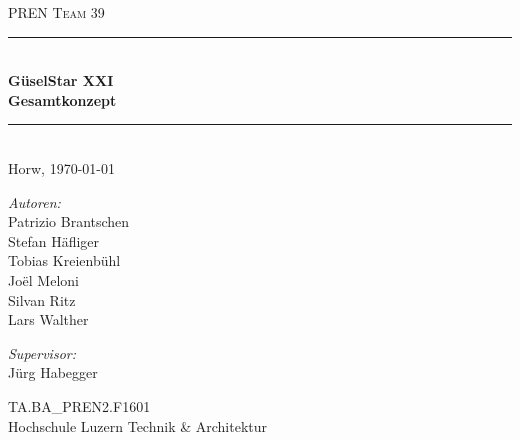 \begin{titlepage}   

\begin{center}
\textsc{\Large PREN Team 39}\\[0.5cm]

\newcommand{\HRule}{\rule{\linewidth}{0.5mm}}
\HRule \\[0.4cm]
{ \huge \bfseries GüselStar XXI}\\[0.4cm]
{ \LARGE \bfseries Gesamtkonzept}\\[0.4cm]
\HRule \\[1.5cm]

{\large Horw, \today}

\begin{figure}[H]%
\centering
\label{fig:activityRoute}
\end{figure}
\begin{minipage}{0.4\textwidth}
\begin{flushleft} \large
\emph{Autoren:}\\
Patrizio Brantschen\\
Stefan Häfliger\\
Tobias Kreienbühl\\
Joël Meloni\\
Silvan Ritz\\
Lars Walther
\end{flushleft}
\end{minipage}
\hfill
\begin{minipage}{0.4\textwidth}
\begin{flushright} \large
\emph{Supervisor:} \\
Jürg Habegger
\end{flushright}
\end{minipage}
\large
\vfill
TA.BA\_PREN2.F1601 \\
Hochschule Luzern Technik \& Architektur

\end{center}

\end{titlepage}